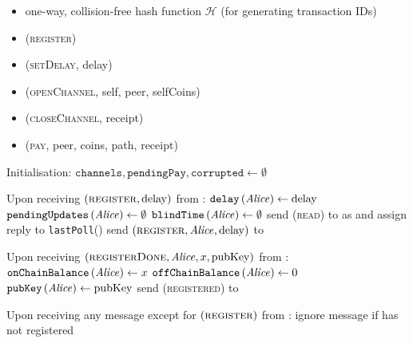 \begin{functionality}{\fpaynet}
  \label{alg:payfunc}
    \begin{itemize}
      \item one-way, collision-free hash function $\mathcal{H}$ (for generating
      transaction IDs)
    \end{itemize}

    \begin{itemize}
      \item (\textsc{register})
      \item (\textsc{setDelay}, delay)
      \item (\textsc{openChannel}, self, peer, selfCoins)
      \item (\textsc{closeChannel}, receipt)
      \item (\textsc{pay}, peer, coins, path, receipt)
    \end{itemize}

  \begin{algorithmic}[1]
    \State Initialisation:
    \Indent
      \State $\mathtt{channels}, \mathtt{pendingPay}, \mathtt{corrupted} \gets
      \emptyset$
    \EndIndent
    \State
  \end{algorithmic}

  \begin{algorithmic}[1]
    \State Upon receiving $\left(\textsc{register}, \mathrm{delay}\right)$ from
    \alice:
    \Indent
      \State $\mathtt{delay}\left(\mathit{Alice}\right) \gets \mathrm{delay}$
      \State $\mathtt{pendingUpdates}\left(\mathit{Alice}\right) \gets \emptyset$
      \State $\mathtt{blindTime}\left(\mathit{Alice}\right) \gets \emptyset$
      \State send (\textsc{read}) to \clock{} as \alice{} and assign reply to
      \texttt{lastPoll}(\alice)
      \State send $\left(\textsc{register}, \mathit{Alice}, \mathrm{delay}\right)$ to
      \simulator
    \EndIndent
    \State

    \State Upon receiving $\left(\textsc{registerDone}, \mathit{Alice}, x,
    \mathrm{pubKey}\right)$ from \simulator:
    \Indent
      \State $\mathtt{onChainBalance}\left(\mathit{Alice}\right) \gets x$
      \State $\mathtt{offChainBalance}\left(\mathit{Alice}\right) \gets 0$
      \State $\mathtt{pubKey}\left(\mathit{Alice}\right) \gets \mathrm{pubKey}$
      \State send (\textsc{registered}) to \alice
    \EndIndent
    \State

    \State Upon receiving any message except for
    $\left(\textsc{register}\right)$ from \alice:
    \Indent
      \State ignore message if \alice{} has not registered
    \EndIndent
    \State


\end{algorithmic}
\end{functionality}
